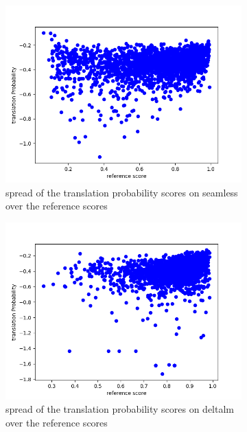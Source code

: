 \begin{figure}[ht]
    \centering%
    \begin{subfigure}{0.4\linewidth}
        \includegraphics[width=\textwidth]{Latex/sections/images/seamlessgenprob.png}
        \caption{spread of the translation probability scores on seamless over the reference scores}
    \end{subfigure}
    \begin{subfigure}{0.4\linewidth}
        \includegraphics[width=\textwidth]{Latex/sections/images/dlmgenprob.png}
        \caption{spread of the translation probability scores on deltalm over the reference scores}
    \end{subfigure}
    \begin{subfigure}{0.4\linewidth}

\end{subfigure}
\end{figure}
